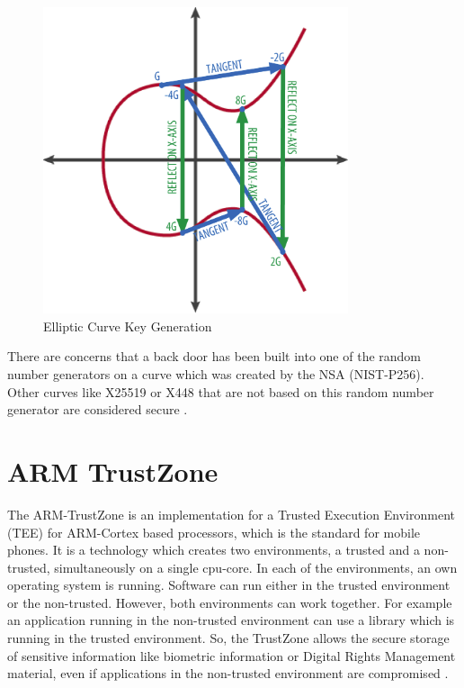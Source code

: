 \documentclass[12pt,oneside,a4paper,parskip]{scrbook}
\begin{document}
\begin{figure}[ht]
 \centering
 \includegraphics[width=0.8\textwidth]{ressources/ecc.png}
 \caption{Elliptic Curve Key Generation \parencite{uszak_elliptic_2017}}
 \label{fig:ecc}
\end{figure}

There are concerns that a back door has been built into one of the random number generators on a curve which was created by the NSA (NIST-P256). Other curves like X25519 or X448 that are not based on this  random number generator are considered secure \parencite{schneier_essays_2007}.

\section{ARM TrustZone}
\label{arm:TrustZone}

The ARM-TrustZone is an implementation for a Trusted Execution Environment (TEE) for ARM-Cortex based processors, which is the standard for mobile phones. It is a technology which creates two environments, a trusted and a non-trusted, simultaneously on a single cpu-core. In each of the environments, an own operating system is running. Software can run either in the trusted environment or the non-trusted. However, both environments can work together. For example an application running in the non-trusted environment can use a library which is running in the trusted environment. So, the TrustZone allows the secure storage of sensitive information like biometric information or Digital Rights Management material, even if applications in the non-trusted environment are compromised \parencite{fowler_trustzone_2017}.
\end{document}
